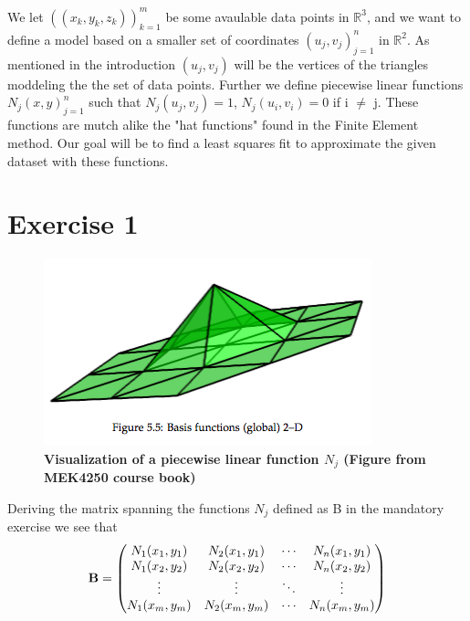 \documentclass[a4paper,norsk]{article}
\begin{document}
\maketitle
We let $((x_k, y_k, z_k))_{k=1}^m$ be some avaulable data points in $\mathbb{R}^3$, and we want to define a model based on a smaller set of 
coordinates ${(u_j, v_j)}_{j=1}^n$ in $\mathbb{R}^2$. As mentioned in the introduction $(u_j, v_j)$ will be the vertices of the triangles moddeling the the set of
data points. Further we define piecewise linear functions ${N_j(x, y)}_{j=1}^n$ such that $N_j(u_j, v_j) = 1$, $N_j(u_i, v_i) = 0$ if i $\neq$ j. These functions are mutch alike the "hat functions" found in the Finite Element method. Our goal will be to find a least squares fit to approximate the given dataset with these functions.

\section*{Exercise 1}
\begin{figure}[h!]
	\centering
	\caption*{\textbf{Visualization of a piecewise linear function $N_j$ \newline (Figure from MEK4250 course book)}}
	\includegraphics[scale=0.36]{element.png}
\end{figure}

Deriving the matrix spanning the functions $N_j$ defined as B in the mandatory exercise we see that 
\begin{align}
\text{\textbf{B}} = 
\begin{pmatrix}
 N_1(x_1,y_1) & N_2(x_1,y_1) & \cdots & N_n(x_1,y_1) \\
 N_1(x_2,y_2) & N_2(x_2,y_2) & \cdots & N_n(x_2,y_2) \\
 \vdots  & \vdots  & \ddots & \vdots  \\
 N_1(x_m,y_m) & N_2(x_m,y_m) & \cdots & N_n(x_m,y_m)
 \end{pmatrix}
\end{align}
\end{document}
